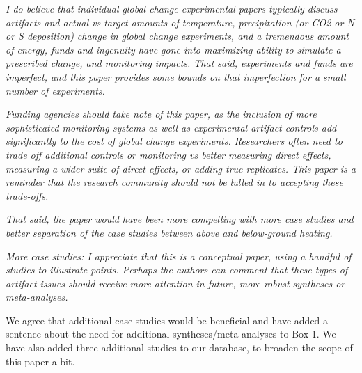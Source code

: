 \documentclass[11pt,a4paper]{letter}
\begin{document}
\par \emph{I do believe that individual global change experimental papers typically discuss artifacts and actual vs target amounts of temperature, precipitation (or CO2 or N or S deposition) change in global change experiments, and a  tremendous amount of energy, funds and ingenuity have gone into maximizing ability to simulate a prescribed change, and monitoring impacts.  That said, experiments and funds are imperfect, and this paper provides some bounds on that imperfection for a small number of experiments.}

\par \emph{Funding agencies should take note of this paper, as the inclusion of more sophisticated monitoring systems as well as experimental artifact controls add significantly to the cost of global change experiments.  Researchers often need to trade off additional controls or monitoring vs better measuring direct effects, measuring a wider suite of direct effects, or adding true replicates.  This paper is a reminder that the research community should not be lulled in to accepting these trade-offs.}

\par \emph{That said, the paper would have been more compelling with more case studies and better separation of the case studies between above and below-ground heating.}

\par \emph{More case studies:  I appreciate that this is a conceptual paper, using a handful of studies to illustrate points.  Perhaps the authors can comment that these types of artifact issues should receive more attention in future, more robust syntheses or meta-analyses.}
\par We agree that additional case studies would be beneficial and have added a sentence about the need for additional syntheses/meta-analyses to Box 1. We have also added three additional studies to our database, to broaden the scope of this paper a bit.  
\end{document}
